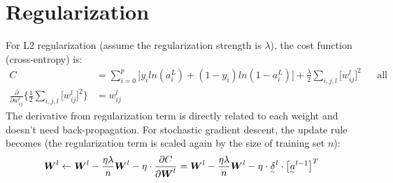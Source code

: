 \documentclass{extarticle}
\theoremstyle{definition}
\theoremstyle{definition}
\newcommand{\mdvec}[1]{\underset{^\sim}#1} %
\newcommand{\mdmat}[1]{\boldsymbol{\MakeUppercase{#1}}} %
\begin{document}
\section{Regularization}
For L2 regularization (assume the regularization strength is $\lambda$), the cost function (cross-entropy) is:
\begin{align*}
	C &= \sum_{i=0}^{p}\bigg[y_i ln(a_i^L) + (1 - y_i) ln(1 - a_i^L)\bigg] + \frac{\lambda}{2} \sum_{i, j, l} \big[w_{ij}^l\big]^2 && \text{all weights in the network}\\
	\frac{\partial}{\partial w_{ij}^l} \bigg\{ \frac{1}{2} \sum_{i, j, l} \big[w_{ij}^l\big]^2 \bigg\} &= w_{ij}^l
\end{align*}
The derivative from regularization term is directly related to each weight and doesn't need back-propagation. For stochastic gradient descent, the update rule becomes (the regularization term is scaled again by the size of training set $n$):
\begin{align*}
	\mdmat{w}^l \leftarrow \mdmat{w}^l - \frac{ \eta \lambda}{n} \mdmat{W}^l - \eta \cdot \frac{\partial C}{\partial \mdmat{w}^l} = \mdmat{w}^l - \frac{ \eta \lambda}{n} \mdmat{W}^l - \eta \cdot \mdvec{\delta^l} \cdot \big[\mdvec{a^{l-1}}\big]^T
\end{align*}
\end{document}
